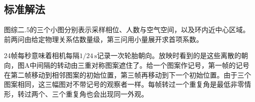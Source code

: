 \documentclass[UTF8,fontset=fandol,a4paper,11pt]{ctexart}
\begin{document}


\subsection*{标准解法}


图综二.5的三个小图分别表示采样相位、人数与空气空间，以及环内近中心区域。前两问由给定物理关系估数量级，第三问用小量展开求首项系数。

24帧每秒意味着相机每隔$1/24\,\mathrm s$记录一次轮胎朝向。放映时看到的是这些离散的朝向，图A中间隔的转动由三重对称图案遮住了。给一个图案作记号，第一帧的记号在第二帧移动到相邻图案的初始位置，第三帧再移动到下一个初始位置。由于三个图案相同，这三幅图对不带记号的观察者一样。每帧转过一个重复角是最低非零情形，转过两个、三个重复角也会出现同一外观。
\end{document}
